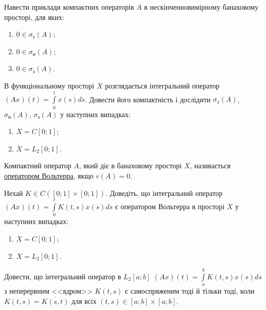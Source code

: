 \begin{exercise}
    Навести приклади компактних операторів $A$ в нескінченновимірному
    банаховому просторі, для яких:
    \begin{enumerate}
        \item $0 \in \sigma_{\text{т}} (A)$;
        \item $0 \in \sigma_{\text{н}} (A)$;
        \item $0 \in \sigma_{\text{з}} (A)$.
    \end{enumerate}
\end{exercise}

\begin{exercise}\label{N:1_8_6}
    В функціональному просторі $X$ розглядається інтегральний оператор 
    $(Ax)(t) = \int\limits_0^t x(s) ds$. Довести його компактність і дослідити
    $\sigma_{\text{т}} (A)$, $\sigma_{\text{н}} (A)$, $\sigma_{\text{з}} (A)$
    у наступних випадках:
    \begin{enumerate}
        \item $X = C[0;1]$;
        \item $X = L_2 [0;1]$.
    \end{enumerate}
\end{exercise}

\begin{theory}
    Компактний оператор $A$, який діє в банаховому просторі $X$, називається
    \ul{оператором Вольтерра}, якщо $r(A) = 0$.
\end{theory}

\begin{exercise}
    Нехай $K \in C([0;1] \times [0;1])$. Доведіть, що інтегральний оператор
    $(Ax)(t) = \int\limits_0^t K(t,s) x(s)ds$ є оператором Вольтерра
    в просторі $X$ у наступних випадках:
    \begin{enumerate}
        \item $X = C[0;1]$;
        \item $X = L_2 [0;1]$. 
    \end{enumerate}
\end{exercise}

\begin{exercise}
    Довести, що інтегральний оператор в $L_2[a;b]$
    $(Ax)(t) = \int\limits_a^b K(t,s) x(s)ds$ з неперервним
    <<ядром>> $K(t,s)$ є самоспряженим тоді й тільки тоді, коли
    $K(t,s) = \overline{K(s,t)}$ для всіх $(t,s) \in [a;b] \times [a;b]$.
\end{exercise}

